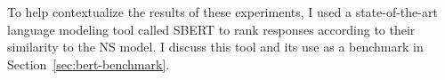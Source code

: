 


To help contextualize the results of these experiments, I used a state-of-the-art language modeling tool called SBERT to rank responses according to their similarity to the NS model. I discuss this tool and its use as a benchmark in Section~\ref{sec:bert-benchmark}.


